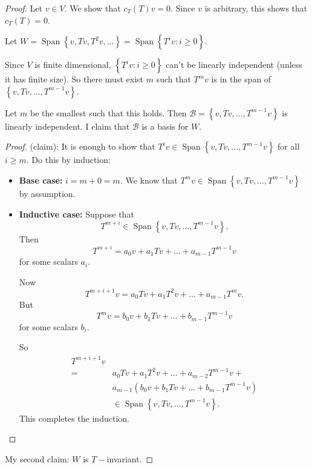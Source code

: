 \documentclass{article}
\theoremstyle{definition} \newtheorem*{definition}{Definition}
\newcommand{\B}{\mathcal{B}}
\DeclareMathOperator{\Span}{Span}
\begin{document}
  \begin{proof}
    Let $v \in V$. We show that $c_T(T)v = 0$. Since $v$ is arbitrary,
    this shows that $c_T(T) = 0$.

    Let $W = \Span\left\{ v, Tv, T^2v, \dots \right\} = 
    \Span\left\{ T^i v : i \geq 0 \right\}$.

    Since $V$ is finite dimensional, $\left\{ T^i v : i \geq 0 \right\}$
    can't be linearly independent (unless it has finite size).
    So there must exist $m$ such that $T^mv$ is in the span of 
    $\left\{ v, Tv, \dots , T^{m-1}v \right\}$.

    Let $m$ be the smallest such that this holds. Then 
    $\B=\left\{ v, Tv, \dots, T^{m-1}v\right\}$ is linearly independent. 
    I claim that $\B$ is a basis for $W$.

    \begin{proof}
      (claim): It is enough to show that $T^iv \in \Span\left\{ 
       v, Tv, \dots, T^{m-1}v  \right\}$ 
       for all $i \geq m$. Do this by induction:

      \begin{itemize}
        \item \textbf{Base case:} $i = m+0 = m$. We know that
          $T^mv \in \Span\left\{ v, Tv, \dots, T^{m-1}v \right\}$ by
           assumption.
         \item \textbf{Inductive case:} Suppose that 
          $$T^{m+i}\in \Span\left\{ v, Tv, \dots, T^{m-1}v \right\}.$$
          Then $$T^{m+i} = 
          a_0v + a_1Tv + \dots + a_{m-1}T^{m-1}v$$ 
          for some scalars $a_i$.

          Now $$T^{m+i+1}v = a_0 Tv + a_1T^2v + \dots + a_{m-1}T^mv.$$
          But $$T^mv = b_0v + b_1Tv + \dots + b_{m-1}T^{m-1}v$$ for
          some scalars $b_i$.

          So 
          \begin{align*}
          T^{m+i+1}v \\=\,&a_0 Tv + a_1T^2v + \dots + a_{m-2}T^{m-1}v
          + \\&a_{m-1}(b_0 v + b_1 Tv + \dots + b_{m-1}T^{m-1}v)
          \\&\in \Span\left\{ v, Tv, \dots, T^{m-1}v \right\}.
          \end{align*}
          This completes the induction.
      \end{itemize}
    \end{proof}

    My second claim: $W$ is $T-$invariant. 
    

\end{proof}
\end{document}
